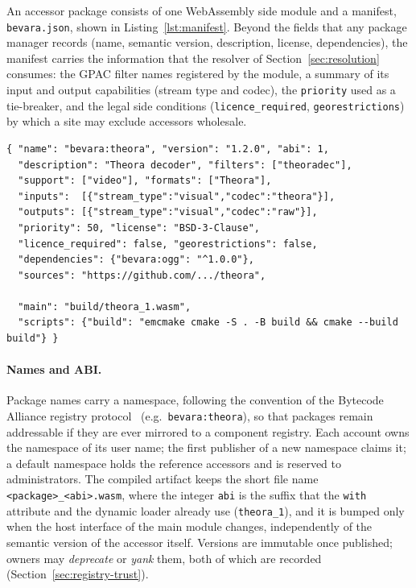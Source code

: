An accessor package consists of one WebAssembly side module and a manifest,
\texttt{bevara.json}, shown in Listing~\ref{lst:manifest}. Beyond the fields
that any package manager records (name, semantic version, description,
license, dependencies), the manifest carries the information that the
resolver of Section~\ref{sec:resolution} consumes: the GPAC filter names
registered by the module, a summary of its input and output capabilities
(stream type and codec), the \texttt{priority} used as a tie-breaker, and the
legal side conditions (\texttt{licence\_required}, \texttt{georestrictions})
by which a site may exclude accessors wholesale.

\begin{lstlisting}[caption={Manifest of the Theora accessor. Fields below the
blank line are build-time only and are stripped when publishing.},
label={lst:manifest},basicstyle=\ttfamily\scriptsize]
{ "name": "bevara:theora", "version": "1.2.0", "abi": 1,
  "description": "Theora decoder", "filters": ["theoradec"],
  "support": ["video"], "formats": ["Theora"],
  "inputs":  [{"stream_type":"visual","codec":"theora"}],
  "outputs": [{"stream_type":"visual","codec":"raw"}],
  "priority": 50, "license": "BSD-3-Clause",
  "licence_required": false, "georestrictions": false,
  "dependencies": {"bevara:ogg": "^1.0.0"},
  "sources": "https://github.com/.../theora",

  "main": "build/theora_1.wasm",
  "scripts": {"build": "emcmake cmake -S . -B build && cmake --build build"} }
\end{lstlisting}

\paragraph{Names and ABI.}
Package names carry a namespace, following the convention of the Bytecode
Alliance registry protocol~\cite{warg} (e.g.\ \texttt{bevara:theora}), so that packages remain
addressable if they are ever mirrored to a component registry. Each account
owns the namespace of its user name; the first publisher of a new namespace
claims it; a default namespace holds the reference accessors and is reserved
to administrators. The compiled artifact keeps the short file name
\texttt{<package>\_<abi>.wasm}, where the integer \texttt{abi} is the suffix that
the \texttt{with} attribute and the dynamic loader already use
(\texttt{theora\_1}), and it is bumped only when the host interface of the
main module changes, independently of the semantic version of the accessor
itself. Versions are immutable once published; owners may \emph{deprecate}
or \emph{yank} them, both of which are recorded (Section~\ref{sec:registry-trust}).

